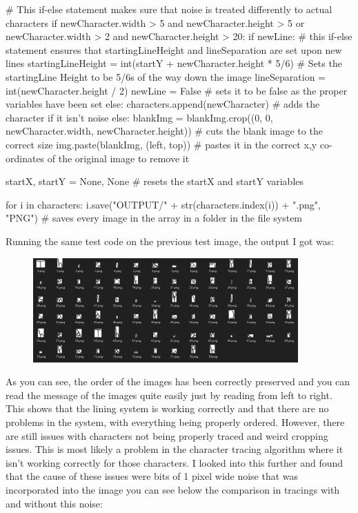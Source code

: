 \documentclass{report}
\begin{document}
\begin{python}
        #  This if-else statement makes sure that noise is treated differently to actual characters
        if newCharacter.width > 5 and newCharacter.height > 5 or newCharacter.width > 2 and newCharacter.height > 20:
            if newLine:  # this if-else statement ensures that startingLineHeight and lineSeparation are set upon new lines
                startingLineHeight = int(startY + newCharacter.height * 5/6)  # Sets the startingLine Height to be 5/6s of the way down the image
                lineSeparation = int(newCharacter.height / 2)
                newLine = False  # sets it to be false as the proper variables have been set
            else:
                characters.append(newCharacter)  # adds the character if it isn't noise
        else:
            blankImg = blankImg.crop((0, 0, newCharacter.width, newCharacter.height))  # cuts the blank image to the correct size
            img.paste(blankImg, (left, top))  # pastes it in the correct x,y co-ordinates of the original image to remove it

        startX, startY = None, None  # resets the startX and startY variables

    for i in characters:
            i.save("OUTPUT/" + str(characters.index(i)) + ".png", "PNG")  # saves every image in the array in a folder in the file system
\end{python}
\newpage
\noindent Running the same test code on the previous test image, the output I got was:
\begin{figure}[H]
    \centering
    \includegraphics[width=4in]{Images/Development and Testing/Stage 6/Tests/Test 3 Output.png}
    \label{fig:Test 3 Output}
\end{figure}
\noindent
As you can see, the order of the images has been correctly preserved and you can read the message of the images quite easily just by reading from left to right. This shows that the lining system is working correctly and that there are no problems in the system, with everything being properly ordered. However, there are still issues with characters not being properly traced and weird cropping issues. This is most likely a problem in the character tracing algorithm where it isn't working correctly for those characters. I looked into this further and found that the cause of these issues were bits of 1 pixel wide noise that was incorporated into the image you can see below the comparison in tracings with  and without this noise:
\end{document}
